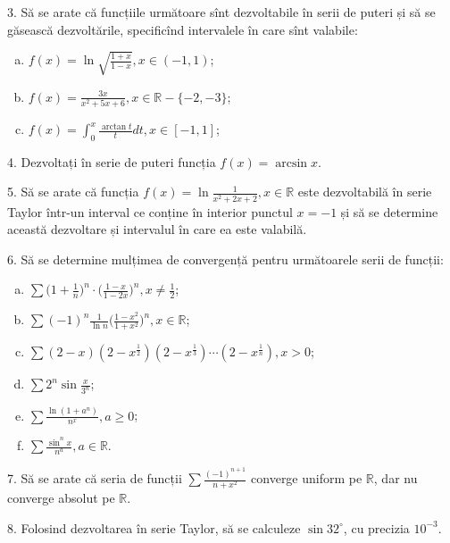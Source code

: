 \documentclass[11pt,a4paper]{article}
\newcommand\ds{\displaystyle}
\newcommand\RR{\mathbb{R}}
\theoremstyle{dotless}
\theoremstyle{dotlessdr}
\begin{document}
3. Să se arate că funcțiile următoare sînt dezvoltabile în serii de puteri și să se găsească
dezvoltările, specificînd intervalele în care sînt valabile:
\begin{enumerate}[(a)]
\item $f(x) = \ln \sqrt{\frac{1 + x}{1 - x}}, x \in (-1, 1)$;
\item $f(x) = \frac{3x}{x^2 + 5x + 6}, x \in \RR - \{-2, -3 \}$;
\item $f(x) = \ds\int_0^x \frac{\arctan t}{t} dt, x \in [-1, 1]$;
\end{enumerate}

\vspace{1cm}

4. Dezvoltați în serie de puteri funcția $f(x) = \arcsin x$.

\vspace{1cm}

5. Să se arate că funcția $f(x) = \ln \frac{1}{x^2 + 2x + 2}, x \in \RR$ este dezvoltabilă
în serie Taylor într-un interval ce conține în interior punctul $x  = -1$ și
să se determine această dezvoltare și intervalul în care ea este valabilă.

\vspace{1cm}

6. Să se determine mulțimea de convergență pentru următoarele serii de funcții:
\begin{enumerate}[(a)]
\item $\sum \Big( 1 + \frac{1}{n} \Big)^n \cdot \Big( \frac{1 - x}{1 - 2x} \Big)^n, x \neq \frac{1}{2}$;
\item $\sum (-1)^n \frac{1}{\ln n} \Big( \frac{1 - x^2}{1 + x^2} \Big)^n, x \in \RR$;
\item $\sum (2 - x)(2 - x^{\frac{1}{2}})(2 - x^{\frac{1}{3}}) \cdots (2 - x^{\frac{1}{n}}), x > 0$;
\item $\sum 2^n \sin \frac{x}{3^n}$;
\item $\sum \frac{\ln(1 + a^n)}{n^x}, a \geq 0$;
\item $\sum \frac{\sin^n x}{n^a}, a \in \RR$.
\end{enumerate}

\vspace{1cm}

7. Să se arate că seria de funcții $\sum \frac{(-1)^{n + 1}}{n + x^2}$ converge uniform
pe $\RR$, dar nu converge absolut pe $\RR$.

\vspace{1cm}

8. Folosind dezvoltarea în serie Taylor, să se calculeze $\sin 32^\circ$, cu precizia
$10^{-3}$.
\end{document}
